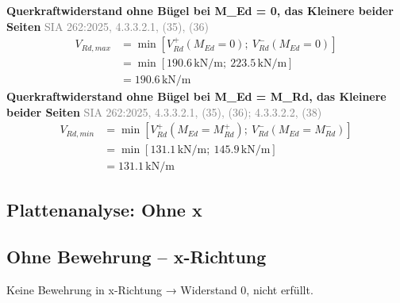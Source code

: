 \documentclass[11pt,a4paper]{article}
\newcommand{\normref}[1]{{\small\textcolor{gray}{#1}}}
\begin{document}
\noindent\textbf{Querkraftwiderstand ohne Bügel bei M\_Ed = 0, das Kleinere beider Seiten} \hfill \normref{SIA 262:2025, 4.3.3.2.1, (35), (36)}
\begin{equation*}
\begin{aligned}
  V_{Rd,max} &= \min\left[V_{Rd}^{+}(M_{Ed} = 0);\ V_{Rd}^{-}(M_{Ed} = 0)\right] \\
  &= \min\left[190.6\,\mathrm{kN}/\mathrm{m};\ 223.5\,\mathrm{kN}/\mathrm{m}\right] \\
  &= 190.6\,\mathrm{kN}/\mathrm{m}
\end{aligned}
\end{equation*}
\noindent\textbf{Querkraftwiderstand ohne Bügel bei M\_Ed = M\_Rd, das Kleinere beider Seiten} \hfill \normref{SIA 262:2025, 4.3.3.2.1, (35), (36); 4.3.3.2.2, (38)}
\begin{equation*}
\begin{aligned}
  V_{Rd,min} &= \min\left[V_{Rd}^{+}(M_{Ed} = M_{Rd}^{+});\ V_{Rd}^{-}(M_{Ed} = M_{Rd}^{-})\right] \\
  &= \min\left[131.1\,\mathrm{kN}/\mathrm{m};\ 145.9\,\mathrm{kN}/\mathrm{m}\right] \\
  &= 131.1\,\mathrm{kN}/\mathrm{m}
\end{aligned}
\end{equation*}
\subsection{Plattenanalyse: Ohne x}
\subsection{Ohne Bewehrung – x-Richtung}
Keine Bewehrung in x-Richtung → Widerstand 0, nicht erfüllt.
\end{document}
